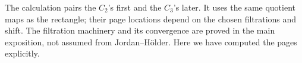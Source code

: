 The calculation pairs the \(C_2\)'s first and the \(C_3\)'s later.
It uses the same quotient maps as the rectangle; their page locations
depend on the chosen filtrations and shift. The filtration machinery
and its convergence are proved in the main exposition, not assumed from
Jordan--Hölder. Here we have computed the pages explicitly.

